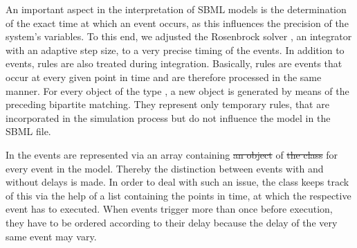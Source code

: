 \documentclass[10pt]{bmc_article}
\newenvironment{bmcformat}{\fussy\setboolean{publ}{true}}{\fussy}
\begin{document}
\begin{bmcformat}
{%
An important aspect in the interpretation of \acs{SBML} models is the determination of the exact time\COR{,}
at which an event occurs, as this influences the precision of the system's variables.
To this end, we adjusted  the Rosenbrock solver \cite{Kotcon2011},
an integrator with an adaptive step size, to a very precise timing of the events. %
% 
In addition to events, rules are also treated during integration.
Basically, rules are events that occur at every given point in time and are therefore processed in the same manner.
For every object of the type \AlgebraicRule, a new \AssignmentRule object is generated by means of the preceding bipartite matching.
They represent only temporary rules, that are incorporated in the simulation process but do not influence the model in the \acs{SBML} file.
%

In the \SBMLinterpreter events are represented via an array containing
\sout{an object} of \sout{the class} \EventInProgress for every event in the model.
Thereby\COR{,} the distinction between events with and without delays is made.
In order to deal with such an issue, the class \SBMLEventInProgressWithDelay
keeps track of this via the help of a list containing the points in time,
at which the respective event has to executed.
When events trigger more than once before execution,
they have to be ordered according to their delay because the delay of the very same event may vary.

}
\end{bmcformat}
\end{document}
